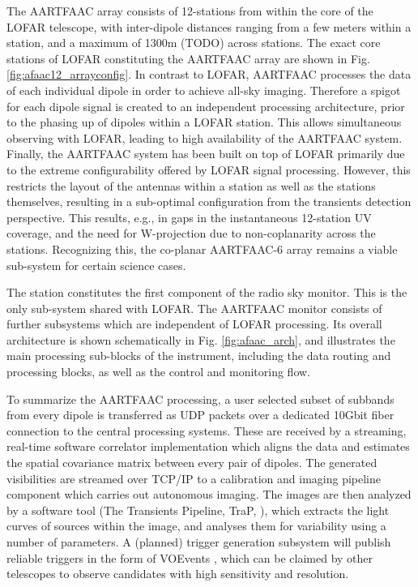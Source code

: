 \documentclass{ws-jai}
\begin{document}
The AARTFAAC  array consists of  12-stations from within  the core of  the LOFAR
telescope,  with inter-dipole  distances  ranging  from a  few  meters within  a
station, and a maximum of 1300m  (TODO) across stations. The exact core stations
of    LOFAR     constituting    the     AARTFAAC    array    are     shown    in
Fig. \ref{fig:afaac12_arrayconfig}.   In contrast  to LOFAR,  AARTFAAC processes
the   data   of  each   individual   dipole   in   order  to   achieve   all-sky
imaging. Therefore a spigot for each  dipole signal is created to an independent
processing  architecture, prior  to the  phasing up  of dipoles  within a  LOFAR
station.   This  allows  simultaneous  observing with  LOFAR,  leading  to  high
availability of the AARTFAAC system. Finally, the AARTFAAC system has been built
on top  of LOFAR primarily due  to the extreme configurability  offered by LOFAR
signal processing. However,  this restricts the layout of the  antennas within a
station  as  well  as  the  stations  themselves,  resulting  in  a  sub-optimal
configuration from the transients detection  perspective. This results, e.g., in
gaps in the instantaneous 12-station UV  coverage, and the need for W-projection
due  to non-coplanarity  across the  stations. Recognizing  this, the  co-planar
AARTFAAC-6 array remains a viable sub-system for certain science cases.

The station  constitutes the first component  of the radio sky  monitor. This is
the only sub-system shared with LOFAR.  The AARTFAAC monitor consists of further
subsystems which are independent of  LOFAR processing.  Its overall architecture
is shown schematically in Fig. \ref{fig:afaac_arch}, and illustrates the main
processing  sub-blocks  of  the  instrument,  including  the  data  routing  and
processing blocks, as well as the control and monitoring flow.

To summarize  the AARTFAAC processing, a  user selected subset of  subbands from
every  dipole is  transferred  as  UDP packets  over  a  dedicated 10Gbit  fiber
connection  to  the  central  processing  systems.   These  are  received  by  a
streaming, real-time  software correlator  implementation which aligns  the data
and estimates the spatial covariance matrix  between every pair of dipoles.  The
generated visibilities  are streamed  over TCP/IP to  a calibration  and imaging
pipeline component  which carries out  autonomous imaging.  The images  are then
analyzed    by   a    software    tool   (The    Transients   Pipeline,    TraP,
\citep{swinbank2015lofar}), which  extracts the  light curves of  sources within
the image,  and analyses them for  variability using a number  of parameters.  A
(planned) trigger  generation subsystem  will publish  reliable triggers  in the
form  of VOEvents  \cite{williams2006voevent},  which can  be  claimed by  other
telescopes to observe candidates with high sensitivity and resolution.
\end{document}
